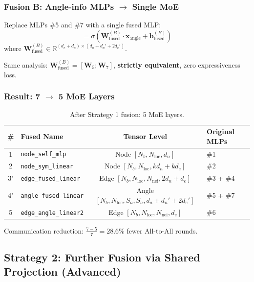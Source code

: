 \documentclass[11pt,a4paper]{article}
\newcommand{\R}{\mathbb{R}}
\newcommand{\act}{\sigma}
\newcommand{\W}{\mathbf{W}}
\newcommand{\bb}{\mathbf{b}}
\newcommand{\x}{\mathbf{x}}
\begin{document}
\subsubsection{Fusion B: Angle-info MLPs $\to$ Single MoE}

Replace MLPs \#5 and \#7 with a single fused MLP:
\begin{equation}
    [\underbrace{y_{\text{e}\leftarrow\text{a}}}_{\R^{d_e}};\; \underbrace{y_{\text{angle}}}_{\R^{d_a}}] = \act\!\left(\W_{\text{fused}}^{(B)} \cdot \x_{\text{angle}} + \bb_{\text{fused}}^{(B)}\right)
\end{equation}
where $\W_{\text{fused}}^{(B)} \in \R^{(d_e + d_a) \times (d_a + d_n' + 2d_e')}$.

Same analysis: $\W_{\text{fused}}^{(B)} = [\W_5; \W_7]$, \textbf{strictly equivalent}, zero expressiveness loss.

\subsubsection{Result: 7 $\to$ 5 MoE Layers}

\begin{table}[h]
\centering
\begin{tabular}{clcl}
\toprule
\# & Fused Name & Tensor Level & Original MLPs \\
\midrule
1 & \texttt{node\_self\_mlp} & Node $[N_b, N_{\text{loc}}, d_n]$ & \#1 \\
2 & \texttt{node\_sym\_linear} & Node $[N_b, N_{\text{loc}}, kd_n + kd_e]$ & \#2 \\
3' & \texttt{edge\_fused\_linear} & Edge $[N_b, N_{\text{loc}}, N_{\text{nei}}, 2d_n+d_e]$ & \#3 + \#4 \\
4' & \texttt{angle\_fused\_linear} & Angle $[N_b, N_{\text{loc}}, S_a, S_a, d_a+d_n'+2d_e']$ & \#5 + \#7 \\
5 & \texttt{edge\_angle\_linear2} & Edge $[N_b, N_{\text{loc}}, N_{\text{nei}}, d_e]$ & \#6 \\
\bottomrule
\end{tabular}
\caption{After Strategy 1 fusion: 5 MoE layers.}
\end{table}

Communication reduction: $\frac{7-5}{7} = 28.6\%$ fewer All-to-All rounds.

\subsection{Strategy 2: Further Fusion via Shared Projection (Advanced)}
\end{document}

